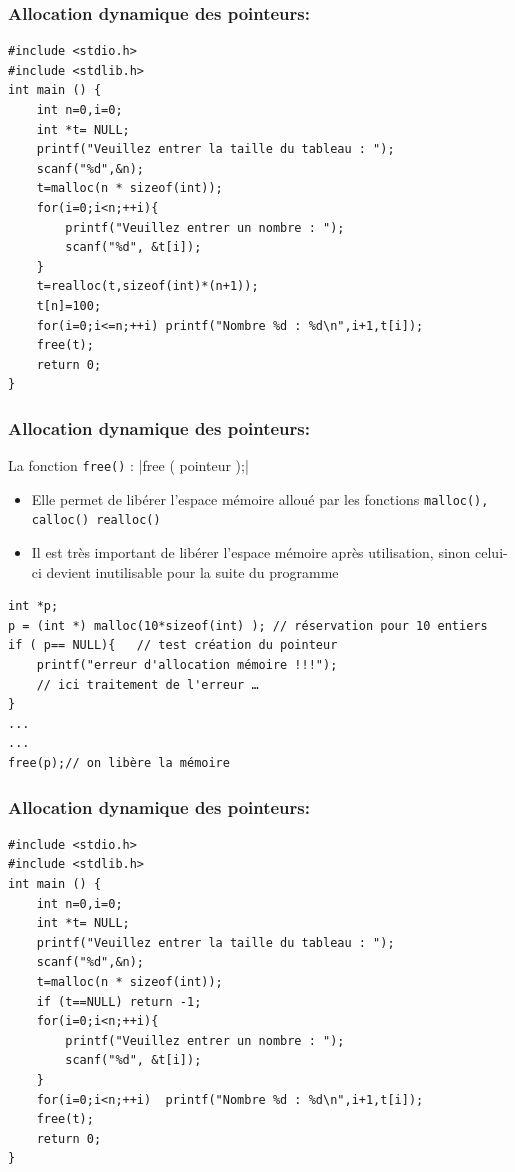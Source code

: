 \documentclass{beamer}
\begin{document}
\begin{frame}[fragile]
\frametitle{Allocation dynamique des pointeurs:}
\begin{verbatim}
#include <stdio.h>
#include <stdlib.h>
int main () {
    int n=0,i=0;
    int *t= NULL;
    printf("Veuillez entrer la taille du tableau : ");
    scanf("%d",&n);
    t=malloc(n * sizeof(int));
    for(i=0;i<n;++i){
        printf("Veuillez entrer un nombre : ");
        scanf("%d", &t[i]);
    }
    t=realloc(t,sizeof(int)*(n+1));
    t[n]=100;
    for(i=0;i<=n;++i) printf("Nombre %d : %d\n",i+1,t[i]);
    free(t);
    return 0;
}
\end{verbatim}
\end{frame}

\begin{frame}[fragile]
\frametitle{Allocation dynamique des pointeurs:}
La fonction {\tt free()} : 
|free ( pointeur );|
\begin{itemize}
\item Elle permet de libérer l'espace mémoire alloué par les fonctions {\tt malloc(), calloc() realloc()}
\item Il est très important de libérer l'espace mémoire après utilisation, sinon celui-ci devient inutilisable pour la suite du programme
\end{itemize}
\begin{verbatim}
int *p;
p = (int *) malloc(10*sizeof(int) ); // réservation pour 10 entiers
if ( p== NULL){   // test création du pointeur	
	printf("erreur d'allocation mémoire !!!");
	// ici traitement de l'erreur …
} 
...
...
free(p);// on libère la mémoire
\end{verbatim}
\end{frame}


\begin{frame}[fragile]
\frametitle{Allocation dynamique des pointeurs:}
\begin{verbatim}
#include <stdio.h>
#include <stdlib.h>
int main () {
    int n=0,i=0;
    int *t= NULL;
    printf("Veuillez entrer la taille du tableau : ");
    scanf("%d",&n);
    t=malloc(n * sizeof(int));
    if (t==NULL) return -1;
    for(i=0;i<n;++i){
        printf("Veuillez entrer un nombre : ");
        scanf("%d", &t[i]);
    }
    for(i=0;i<n;++i)  printf("Nombre %d : %d\n",i+1,t[i]);
    free(t);
    return 0;
}
\end{verbatim}
\end{frame}
\end{document}
